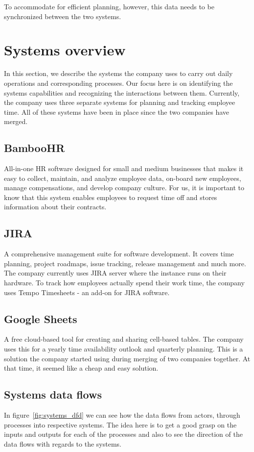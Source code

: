 \documentclass[12pt,oneside]{fithesis2}
\begin{document}
To accommodate for efficient planning, however, this data needs to be synchronized between the two systems.

\section{Systems overview}
In this section, we describe the systems the company uses to carry out daily operations and corresponding processes. Our focus here is on identifying the systems capabilities and recognizing the interactions between them. Currently, the company uses three separate systems for planning and tracking employee time. All of these systems have been in place since the two companies have merged.
\subsection*{BambooHR}
All-in-one HR software designed for small and medium businesses that makes it easy to collect, maintain, and analyze employee data, on-board new employees, manage compensations, and develop company culture.\cite{bambooHR} For us, it is important to know that this system enables employees to request time off and stores information about their contracts.
\subsection*{JIRA}
A comprehensive management suite for software development. It covers time planning, project roadmaps, issue tracking, release management and much more. The company currently uses JIRA server where the instance runs on their hardware. To track how employees actually spend their work time, the company uses Tempo Timesheets - an add-on for JIRA software.
\subsection*{Google Sheets}
A free cloud-based tool for creating and sharing cell-based tables. The company uses this for a yearly time availability outlook and quarterly planning. This is a solution the company started using during merging of two companies together. At that time, it seemed like a cheap and easy solution.
\subsection{Systems data flows}
In figure~\ref{fig:systems_dfd} we can see how the data flows from actors, through processes into respective systems. The idea here is to get a good grasp on the inputs and outputs for each of the processes and also to see the direction of the data flows with regards to the systems.
\end{document}
